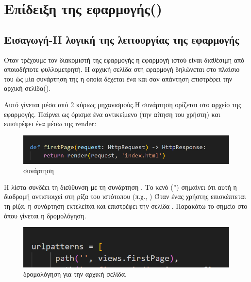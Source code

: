\chapter{Επίδειξη της εφαρμογής()}

\section{Εισαγωγή-Η λογική της λειτουργίας της εφαρμογής }

Όταν τρέχουμε τον διακομιστή της εφαρμογής η εφαρμογή ιστού
είναι διαθέσιμη από οποιοδήποτε φυλλομετρητή. Η αρχική σελίδα στη εφαρμογή
 δηλώνεται στο πλαίσιο του  ώς μία συνάρτηση της 
η οποία δέχεται ένα  και σαν απάντηση επιστρέφει την αρχική σελίδα().

Αυτό γίνεται μέσα από 2 κύριως μηχανισμούς.Η συνάρτηση  ορίζεται στο αρχείο  της εφαρμογής. Παίρνει ως όρισμα ένα αντικείμενο  
(την αίτηση του χρήστη) και επιστρέφει ένα  μέσω της render:

\begin{figure}[h]
	\centering
	\includegraphics[width=1.0\textwidth]{graphics/firstPage.png}
	\caption{  συνάρτηση}
\end{figure}

Η λίστα  συνδέει τη διεύθυνση  
με τη συνάρτηση . Το κενό  ('') σημαίνει ότι αυτή η διαδρομή αντιστοιχεί στη ρίζα του ιστότοπου (π.χ., )
Όταν ένας χρήστης επισκέπτεται τη ρίζα, η συνάρτηση  
εκτελείται και επιστρέφει την  σελίδα . Παρακάτω το σημείο στο  όπου γίνεται η δρομολόγηση.

\begin{figure}[h]
	\centering
	\includegraphics[width=1.0\textwidth]{graphics/urls_firstPage.png}
	\caption{  δρομολόγηση για την αρχική σελίδα.}
\end{figure}



